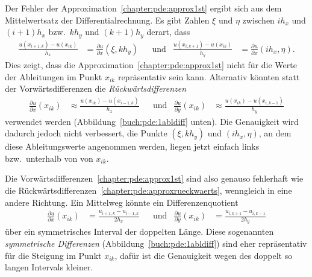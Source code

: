Der Fehler der Approximation~\eqref{chapter:pde:approx1st} ergibt sich
aus dem Mittelwertsatz der Differentialrechnung.
Es gibt Zahlen $\xi$ und $\eta$ zwischen $ih_x$ und $(i+1)h_x$
bzw.~$kh_y$ und $(k+1)h_y$ derart, dass
\begin{align*}
\frac{u(x_{i+1,k}) - u(x_{ik})}{h_x}
&=
\frac{\partial u}{\partial x}(\xi, kh_y)
&
&\text{und}
&
\frac{u(x_{i,k+1}) - u(x_{ik})}{h_y}
&=
\frac{\partial u}{\partial x}(ih_x, \eta).
\end{align*}
Dies zeigt, dass die Approximation~\eqref{chapter:pde:approx1st}
nicht für die Werte der Ableitungen im Punkt $x_{ik}$ repräsentativ 
sein kann.
Alternativ könnten statt der Vorwärtsdifferenzen die {\em Rückwärtsdifferenzen}
\begin{align}
\frac{\partial u}{\partial x} (x_{ik}) 
&\approx
\frac{u(x_{ik}) - u(x_{i-1,k})}{h_x}
&
&\text{und}
&
\frac{\partial u}{\partial y} (x_{ik}) 
&\approx
\frac{u(x_{ik}) - u(x_{i,k-1})}{h_y}
\label{chapter:pde:approxrueckwaerts}
\end{align}
verwendet werden (Abbildung~\ref{buch:pde:1abldiff} unten).
Die Genauigkeit wird dadurch jedoch nicht verbessert, die Punkte
$(\xi,kh_y)$ und $(ih_x,\eta)$, an dem diese Ableitungswerte angenommen
werden, liegen jetzt einfach links bzw.~unterhalb von von $x_{ik}$.

Die Vorwärtsdifferenzen~\eqref{chapter:pde:approx1st} sind also
genauso fehlerhaft wie
die Rückwärtsdifferenzen~\eqref{chapter:pde:approxrueckwaerts},
wenngleich in eine andere Richtung.
Ein Mittelweg könnte ein Differenzenquotient
\begin{align*}
\frac{\partial u}{\partial x}(x_{ik})
&=
\frac{u_{i+1,k}-u_{i-1,k}}{2h_x}
&&\text{und}
&
\frac{\partial u}{\partial y}(x_{ik})
&=
\frac{u_{i,k+1}-u_{i,k-1}}{2h_y}
\end{align*}
über ein symmetrisches Interval der doppelten Länge.
%
Diese sogenannten {\em symmetrische Differenzen}
(Abbildung~\ref{buch:pde:1abldiff}) sind eher repräsentativ
für die Steigung im Punkt $x_{ik}$, dafür ist die Genauigkeit wegen des
doppelt so langen Intervals kleiner.

